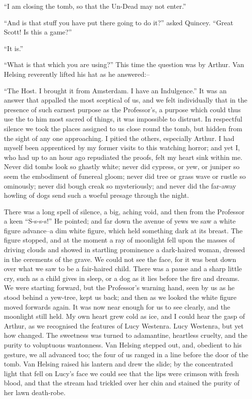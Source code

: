 \documentclass[12pt,openright]{book}
\begin{document}
“I am closing the tomb, so that the Un-Dead may not enter.”

“And is that stuff you have put there going to do it?” asked Quincey. “Great Scott! Is this a game?”

“It is.”

“What is that which you are using?” This time the question was by Arthur. Van Helsing reverently lifted his hat as he answered:–

“The Host. I brought it from Amsterdam. I have an Indulgence.” It was an answer that appalled the most sceptical of us, and we felt individually that in the presence of such earnest purpose as the Professor’s, a purpose which could thus use the to him most sacred of things, it was impossible to distrust. In respectful silence we took the places assigned to us close round the tomb, but hidden from the sight of any one approaching. I pitied the others, especially Arthur. I had myself been apprenticed by my former visits to this watching horror; and yet I, who had up to an hour ago repudiated the proofs, felt my heart sink within me. Never did tombs look so ghastly white; never did cypress, or yew, or juniper so seem the embodiment of funereal gloom; never did tree or grass wave or rustle so ominously; never did bough creak so mysteriously; and never did the far-away howling of dogs send such a woeful presage through the night.

There was a long spell of silence, a big, aching void, and then from the Professor a keen “S-s-s-s!” He pointed; and far down the avenue of yews we saw a white figure advance–a dim white figure, which held something dark at its breast. The figure stopped, and at the moment a ray of moonlight fell upon the masses of driving clouds and showed in startling prominence a dark-haired woman, dressed in the cerements of the grave. We could not see the face, for it was bent down over what we saw to be a fair-haired child. There was a pause and a sharp little cry, such as a child gives in sleep, or a dog as it lies before the fire and dreams. We were starting forward, but the Professor’s warning hand, seen by us as he stood behind a yew-tree, kept us back; and then as we looked the white figure moved forwards again. It was now near enough for us to see clearly, and the moonlight still held. My own heart grew cold as ice, and I could hear the gasp of Arthur, as we recognised the features of Lucy Westenra. Lucy Westenra, but yet how changed. The sweetness was turned to adamantine, heartless cruelty, and the purity to voluptuous wantonness. Van Helsing stepped out, and, obedient to his gesture, we all advanced too; the four of us ranged in a line before the door of the tomb. Van Helsing raised his lantern and drew the slide; by the concentrated light that fell on Lucy’s face we could see that the lips were crimson with fresh blood, and that the stream had trickled over her chin and stained the purity of her lawn death-robe.
\end{document}
